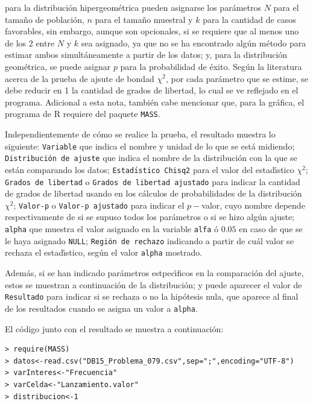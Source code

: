 \begin{solucion}
 para la distribuci\'on hipergeom\'etrica pueden asignarse
 los par\'ametros $N$ para el tama\~no de poblaci\'on,
 $n$ para el tama\~no muestral y $k$ para la cantidad de casos favorables,
 sin embargo, aunque son opcionales, si se requiere
 que al menos uno de los 2 entre $N$ y $k$ sea asignado,
 ya que no se ha encontrado alg\'un m\'etodo para estimar ambos
 simult\'aneamente a partir de los datos;
 y, para la distribuci\'on geom\'etrica, se puede asignar $p$
 para la probabilidad de \'exito.
 Seg\'un la literatura acerca de la prueba de ajsute de bondad $\chi^2$,
 por cada par\'ametro que se estime, se debe reducir en 1
 la cantidad de grados de libertad,
 lo cual se ve reflejado en el programa.
 Adicional a esta nota, tambi\'en cabe mencionar que, para la gr\'afica,
 el programa de R requiere del paquete \texttt{MASS}.
 \par
 Independientemente de c\'omo se realice la prueba, 
 el resultado muestra lo siguiente:
 \texttt{Variable} que indica el nombre y unidad
 de lo que se est\'a midiendo;
 \texttt{Distribuci\'on de ajuste} que indica el nombre
 de la distribuci\'on con la que se est\'an comparando los datos;
 \texttt{Estad\'{\i}stico Chisq2} para el valor del estad\'{\i}stico
 $\chi^2$;
 \texttt{Grados de libertad} o \texttt{Grados de libertad ajustado}
 para indicar la cantidad de grados de libertad usando en los c\'alculos
 de probabilidades de la distribuci\'on $\chi^2$;
 \texttt{Valor-p} o \texttt{Valor-p ajustado} para indicar
 el $p-$valor, cuyo nombre depende respectivamente de si se supuso
 todos los par\'ametros o si se hizo alg\'un ajuste;
 \texttt{alpha} que muestra el valor asignado en la variable \texttt{alfa} \'o $0.05$ en caso de que se le haya asignado \texttt{NULL};
 \texttt{Regi\'on de rechazo} indicando a partir de cu\'al valor
 se rechaza el estad\'{\i}stico, seg\'un el valor \texttt{alpha} mostrado.
 \par
 Adem\'as, si se han indicado par\'ametros estpec\'{\i}ficos
 en la comparaci\'on del ajuste, estos se muestran a continuaci\'on
 de la distribuci\'on; y puede aparecer el valor de \texttt{Resultado}
 para indicar si se rechaza o no la hip\'otesis nula,
 que aparece al final de los resultados cuando se asigna un valor
 a \texttt{alpha}.
 \par 
 El c\'odigo junto con el resultado se muestra a continuaci\'on:
 \begin{verbatim}
> require(MASS)
> datos<-read.csv("DB15_Problema_079.csv",sep=";",encoding="UTF-8")
> varInteres<-"Frecuencia"
> varCelda<-"Lanzamiento.valor"
> distribucion<-1

\end{verbatim}
\end{solucion}
